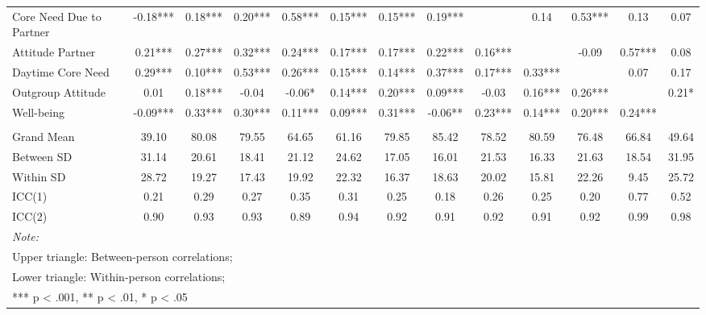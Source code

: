 \begin{sidewaystable}
{\begin{tabular}[t]{lcccccccccccc}
\hspace{1em}Core Need Due to Partner & -0.18*** & 0.18*** & 0.20*** & 0.58*** & 0.15*** & 0.15*** & 0.19*** &  & 0.14 & 0.53*** & 0.13 & 0.07\\
\hspace{1em}Attitude Partner & 0.21*** & 0.27*** & 0.32*** & 0.24*** & 0.17*** & 0.17*** & 0.22*** & 0.16*** &  & -0.09 & 0.57*** & 0.08\\
\hspace{1em}Daytime Core Need & 0.29*** & 0.10*** & 0.53*** & 0.26*** & 0.15*** & 0.14*** & 0.37*** & 0.17*** & 0.33*** &  & 0.07 & 0.17\\
\hspace{1em}Outgroup Attitude & 0.01 & 0.18*** & -0.04 & -0.06* & 0.14*** & 0.20*** & 0.09*** & -0.03 & 0.16*** & 0.26*** &  & 0.21*\\
\hspace{1em}Well-being & -0.09*** & 0.33*** & 0.30*** & 0.11*** & 0.09*** & 0.31*** & -0.06** & 0.23*** & 0.14*** & 0.20*** & 0.24*** & \\
\addlinespace[0.3em]
\multicolumn{13}{l}{\textbf{Descriptives}}\\
\hspace{1em}Grand Mean & 39.10 & 80.08 & 79.55 & 64.65 & 61.16 & 79.85 & 85.42 & 78.52 & 80.59 & 76.48 & 66.84 & 49.64\\
\hspace{1em}Between SD & 31.14 & 20.61 & 18.41 & 21.12 & 24.62 & 17.05 & 16.01 & 21.53 & 16.33 & 21.63 & 18.54 & 31.95\\
\hspace{1em}Within SD & 28.72 & 19.27 & 17.43 & 19.92 & 22.32 & 16.37 & 18.63 & 20.02 & 15.81 & 22.26 & 9.45 & 25.72\\
\hspace{1em}ICC(1) & 0.21 & 0.29 & 0.27 & 0.35 & 0.31 & 0.25 & 0.18 & 0.26 & 0.25 & 0.20 & 0.77 & 0.52\\
\hspace{1em}ICC(2) & 0.90 & 0.93 & 0.93 & 0.89 & 0.94 & 0.92 & 0.91 & 0.92 & 0.91 & 0.92 & 0.99 & 0.98\\
\bottomrule
\multicolumn{13}{l}{\rule{0pt}{1em}\textit{Note: }}\\
\multicolumn{13}{l}{\rule{0pt}{1em}Upper triangle: Between-person correlations;}\\
\multicolumn{13}{l}{\rule{0pt}{1em}Lower triangle: Within-person correlations;}\\
\multicolumn{13}{l}{\rule{0pt}{1em}*** p < .001, ** p < .01,  * p < .05}\\
\end{tabular}}
\end{sidewaystable}
